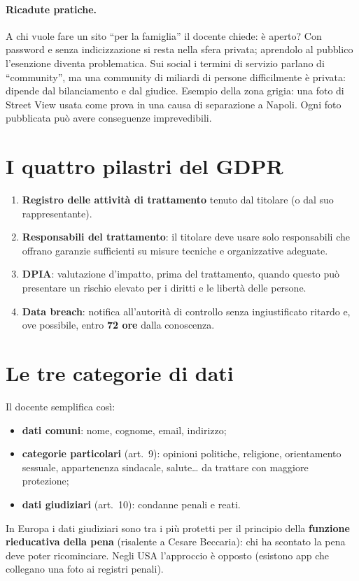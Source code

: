 \paragraph{Ricadute pratiche.} A chi vuole fare un sito ``per la famiglia'' il docente chiede: è
aperto? Con password e senza indicizzazione si resta nella sfera privata; aprendolo al pubblico
l'esenzione diventa problematica. Sui social i termini di servizio parlano di ``community'', ma una
community di miliardi di persone difficilmente è privata: dipende dal bilanciamento e dal giudice.
Esempio della zona grigia: una foto di Street View usata come prova in una causa di separazione a
Napoli. Ogni foto pubblicata può avere conseguenze imprevedibili.

\section{I quattro pilastri del GDPR}
\begin{enumerate}
  \item \textbf{Registro delle attività di trattamento} tenuto dal titolare (o dal suo
    rappresentante).
  \item \textbf{Responsabili del trattamento}: il titolare deve usare solo responsabili che offrano
    garanzie sufficienti su misure tecniche e organizzative adeguate.
  \item \textbf{DPIA}: valutazione d'impatto, prima del trattamento, quando questo può presentare un
    rischio elevato per i diritti e le libertà delle persone.
  \item \textbf{Data breach}: notifica all'autorità di controllo senza ingiustificato ritardo e, ove
    possibile, entro \textbf{72 ore} dalla conoscenza.
\end{enumerate}

\section{Le tre categorie di dati}
Il docente semplifica così:
\begin{itemize}
  \item \textbf{dati comuni}: nome, cognome, email, indirizzo;
  \item \textbf{categorie particolari} (art.~9): opinioni politiche, religione, orientamento sessuale,
    appartenenza sindacale, salute\ldots{} da trattare con maggiore protezione;
  \item \textbf{dati giudiziari} (art.~10): condanne penali e reati.
\end{itemize}
In Europa i dati giudiziari sono tra i più protetti per il principio della \textbf{funzione rieducativa
della pena} (risalente a Cesare Beccaria): chi ha scontato la pena deve poter ricominciare. Negli USA
l'approccio è opposto (esistono app che collegano una foto ai registri penali).

